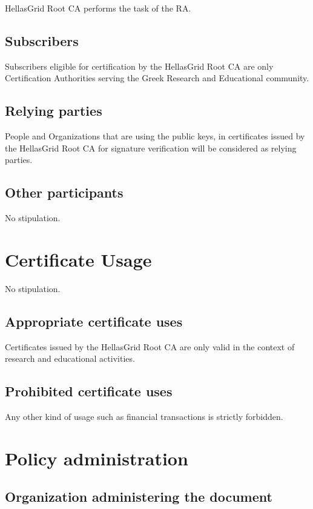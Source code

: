 \documentclass[11pt,a4paper,titlepage]{book}
\begin{document}
HellasGrid Root CA performs the task of the RA.


\subsection{Subscribers}

Subscribers eligible for certification by the HellasGrid Root CA are only Certification Authorities serving the Greek Research and Educational community.

\subsection{Relying parties}

People and Organizations that are using the public keys, in certificates issued by the HellasGrid Root CA for signature verification will be considered as relying parties.


\subsection{Other participants}

No stipulation. 

\section{Certificate Usage}

No stipulation.

\subsection{Appropriate certificate uses}

Certificates issued by the HellasGrid Root CA are only valid in the context of research and educational activities.

\subsection{Prohibited certificate uses}

Any other kind of usage such as financial transactions is strictly forbidden.

\section{Policy administration}
\subsection{Organization administering the document}
\label{sub:OrganizationAdministeringTheDocument}
\end{document}

